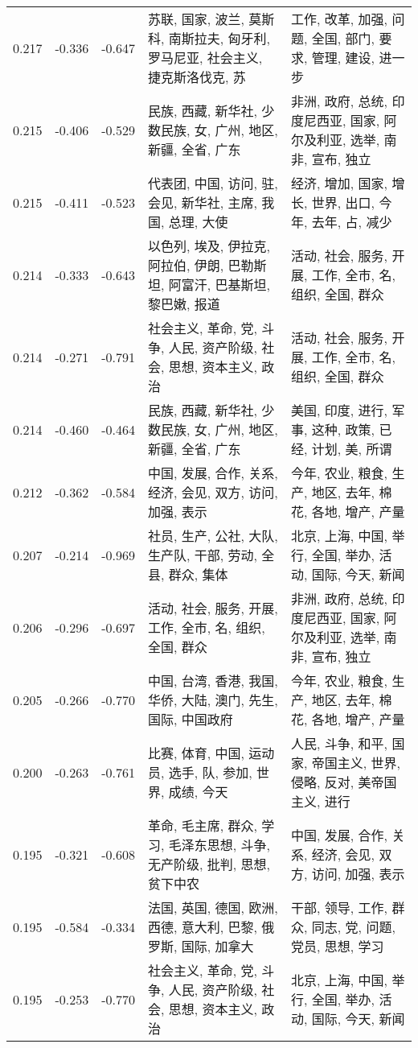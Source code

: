 \begin{tabular}{cccp{5cm}p{5cm}}
0.217 & -0.336 & -0.647 & 苏联, 国家, 波兰, 莫斯科, 南斯拉夫, 匈牙利, 罗马尼亚, 社会主义, 捷克斯洛伐克, 苏 & 工作, 改革, 加强, 问题, 全国, 部门, 要求, 管理, 建设, 进一步 \\
0.215 & -0.406 & -0.529 & 民族, 西藏, 新华社, 少数民族, 女, 广州, 地区, 新疆, 全省, 广东 & 非洲, 政府, 总统, 印度尼西亚, 国家, 阿尔及利亚, 选举, 南非, 宣布, 独立 \\
0.215 & -0.411 & -0.523 & 代表团, 中国, 访问, 驻, 会见, 新华社, 主席, 我国, 总理, 大使 & 经济, 增加, 国家, 增长, 世界, 出口, 今年, 去年, 占, 减少 \\
0.214 & -0.333 & -0.643 & 以色列, 埃及, 伊拉克, 阿拉伯, 伊朗, 巴勒斯坦, 阿富汗, 巴基斯坦, 黎巴嫩, 报道 & 活动, 社会, 服务, 开展, 工作, 全市, 名, 组织, 全国, 群众 \\
0.214 & -0.271 & -0.791 & 社会主义, 革命, 党, 斗争, 人民, 资产阶级, 社会, 思想, 资本主义, 政治 & 活动, 社会, 服务, 开展, 工作, 全市, 名, 组织, 全国, 群众 \\
0.214 & -0.460 & -0.464 & 民族, 西藏, 新华社, 少数民族, 女, 广州, 地区, 新疆, 全省, 广东 & 美国, 印度, 进行, 军事, 这种, 政策, 已经, 计划, 美, 所谓 \\
0.212 & -0.362 & -0.584 & 中国, 发展, 合作, 关系, 经济, 会见, 双方, 访问, 加强, 表示 & 今年, 农业, 粮食, 生产, 地区, 去年, 棉花, 各地, 增产, 产量 \\
0.207 & -0.214 & -0.969 & 社员, 生产, 公社, 大队, 生产队, 干部, 劳动, 全县, 群众, 集体 & 北京, 上海, 中国, 举行, 全国, 举办, 活动, 国际, 今天, 新闻 \\
0.206 & -0.296 & -0.697 & 活动, 社会, 服务, 开展, 工作, 全市, 名, 组织, 全国, 群众 & 非洲, 政府, 总统, 印度尼西亚, 国家, 阿尔及利亚, 选举, 南非, 宣布, 独立 \\
0.205 & -0.266 & -0.770 & 中国, 台湾, 香港, 我国, 华侨, 大陆, 澳门, 先生, 国际, 中国政府 & 今年, 农业, 粮食, 生产, 地区, 去年, 棉花, 各地, 增产, 产量 \\
0.200 & -0.263 & -0.761 & 比赛, 体育, 中国, 运动员, 选手, 队, 参加, 世界, 成绩, 今天 & 人民, 斗争, 和平, 国家, 帝国主义, 世界, 侵略, 反对, 美帝国主义, 进行 \\
0.195 & -0.321 & -0.608 & 革命, 毛主席, 群众, 学习, 毛泽东思想, 斗争, 无产阶级, 批判, 思想, 贫下中农 & 中国, 发展, 合作, 关系, 经济, 会见, 双方, 访问, 加强, 表示 \\
0.195 & -0.584 & -0.334 & 法国, 英国, 德国, 欧洲, 西德, 意大利, 巴黎, 俄罗斯, 国际, 加拿大 & 干部, 领导, 工作, 群众, 同志, 党, 问题, 党员, 思想, 学习 \\
0.195 & -0.253 & -0.770 & 社会主义, 革命, 党, 斗争, 人民, 资产阶级, 社会, 思想, 资本主义, 政治 & 北京, 上海, 中国, 举行, 全国, 举办, 活动, 国际, 今天, 新闻 \\

\end{tabular}
